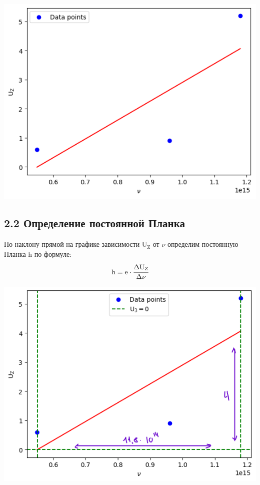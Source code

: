 \documentclass[12pt,openany]{book}
\begin{document}
\begin{center}
    \includegraphics[scale=0.59]{K4-U_NU1} \\
\end{center}

\subsection*{2.2  Определение постоянной Планка}

\vspace{10pt}

\noindent По наклону прямой на графике зависимости $\text{U}_\text{Z}$ 
от $\nu$ определим постоянную Планка h по формуле:\\

\begin{equation*}
    \text{h} = \text{e} \cdot \cfrac{\Delta \text{U}_\text{Z}}{\Delta \nu}
\end{equation*}

\begin{center}
    \includegraphics[scale=0.59]{K4-U_NU2} \\
\end{center}
\end{document}
